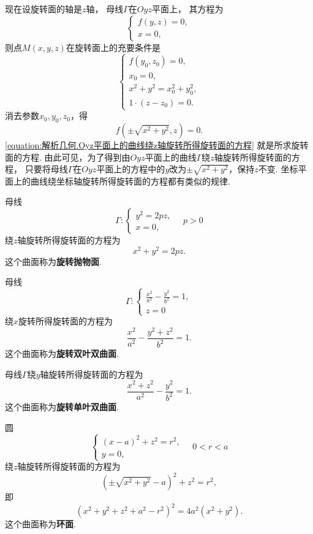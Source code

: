 现在设旋转面的轴是\(z\)轴，
母线\(\Gamma\)在\(Oyz\)平面上，
其方程为\[
	\left\{ \begin{array}{l}
		f(y,z) = 0, \\
		x = 0,
	\end{array} \right.
\]
则点\(M(x,y,z)\)在旋转面上的充要条件是\[
	\left\{ \begin{array}{l}
		f(y_0,z_0) = 0, \\
		x_0 = 0, \\
		x^2+y^2=x_0^2+y_0^2, \\
		1\cdot(z-z_0) = 0.
	\end{array} \right.
\]
消去参数\(x_0,y_0,z_0\)，得
\begin{equation}\label{equation:解析几何.Oyz平面上的曲线绕z轴旋转所得旋转面的方程}
	f(\pm\sqrt{x^2+y^2},z) = 0.
\end{equation}
\cref{equation:解析几何.Oyz平面上的曲线绕z轴旋转所得旋转面的方程} 就是所求旋转面的方程.
由此可见，为了得到由\(Oyz\)平面上的曲线\(\Gamma\)绕\(z\)轴旋转所得旋转面的方程，
只要将母线\(\Gamma\)在\(Oyz\)平面上的方程中的\(y\)改为\(\pm\sqrt{x^2+y^2}\)，保持\(z\)不变.
坐标平面上的曲线绕坐标轴旋转所得旋转面的方程都有类似的规律.

\begin{example}
母线\[
	\Gamma: \left\{ \begin{array}{l}
		y^2 = 2pz, \\
		x = 0,
	\end{array} \right.
	\quad p>0
\]
绕\(z\)轴旋转所得旋转面的方程为\[
	x^2+y^2=2pz.
\]
这个曲面称为\textbf{旋转抛物面}.
\end{example}

\begin{example}
母线\[
	\Gamma: \left\{ \begin{array}{l}
		\frac{x^2}{a^2}-\frac{y^2}{b^2}=1, \\
		z=0
	\end{array} \right.
\]
绕\(x\)旋转所得旋转面的方程为\[
	\frac{x^2}{a^2}-\frac{y^2+z^2}{b^2}=1.
\]
这个曲面称为\textbf{旋转双叶双曲面}.

母线\(\Gamma\)绕\(y\)轴旋转所得旋转面的方程为\[
	\frac{x^2+z^2}{a^2}-\frac{y^2}{b^2}=1.
\]
这个曲面称为\textbf{旋转单叶双曲面}.
\end{example}

\begin{example}
圆\[
	\left\{ \begin{array}{l}
		(x-a)^2+z^2=r^2, \\
		y=0,
	\end{array} \right.
	\quad 0<r<a
\]
绕\(z\)轴旋转所得旋转面的方程为\[
	(\pm\sqrt{x^2+y^2}-a)^2+z^2=r^2,
\]
即\[
	(x^2+y^2+z^2+a^2-r^2)^2=4a^2(x^2+y^2).
\]
这个曲面称为\textbf{环面}.
\end{example}

